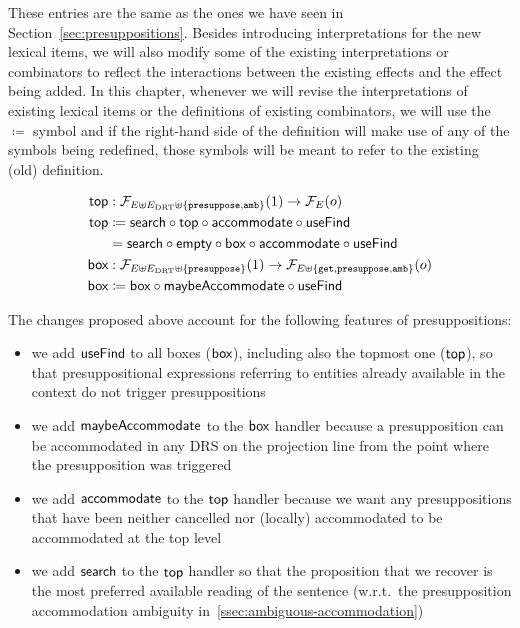 These entries are the same as the ones we have seen in
Section~\ref{sec:presuppositions}. Besides introducing interpretations for
the new lexical items, we will also modify some of the existing
interpretations or combinators to reflect the interactions between the
existing effects and the effect being added. In this chapter, whenever we
will revise the interpretations of existing lexical items or the
definitions of existing combinators, we will use the $\coloneqq$ symbol and
if the right-hand side of the definition will make use of any of the
symbols being redefined, those symbols will be meant to refer to the
existing (old) definition.

\begin{align*}
  \textsf{top} &: \mathcal{F}_{E \uplus E_{\mathrm{DRT}} \uplus \{\mathtt{presuppose}, \mathtt{amb}\}}(1) \to \mathcal{F}_{E}(o) \\
  \textsf{top} &\coloneqq \textsf{search} \mathbin{\circ} \textsf{top} \mathbin{\circ} \textsf{accommodate} \mathbin{\circ} \textsf{useFind} \\
       &= \textsf{search} \mathbin{\circ} \textsf{empty} \mathbin{\circ} \textsf{box} \mathbin{\circ} \textsf{accommodate} \mathbin{\circ} \textsf{useFind} \\
  \textsf{box} &: \mathcal{F}_{E \uplus E_{\mathrm{DRT}} \uplus \{\mathtt{presuppose}\}}(1) \to \mathcal{F}_{E \uplus \{\mathtt{get}, \mathtt{presuppose}, \mathtt{amb}\}}(o) \\
  \textsf{box} &\coloneqq \textsf{box} \mathbin{\circ} \textsf{maybeAccommodate} \mathbin{\circ} \textsf{useFind} \\
\end{align*}

The changes proposed above account for the following features of
presuppositions:

\begin{itemize}
\item we add $\textsf{useFind}$ to all boxes ($\textsf{box}$), including also the topmost
  one ($\textsf{top}$), so that presuppositional expressions referring to entities
  already available in the context do not trigger presuppositions
\item we add $\textsf{maybeAccommodate}$ to the $\textsf{box}$ handler because a
  presupposition can be accommodated in any DRS on the projection line from
  the point where the presupposition was triggered
\item we add $\textsf{accommodate}$ to the $\textsf{top}$ handler because we want any
  presuppositions that have been neither cancelled nor (locally)
  accommodated to be accommodated at the top level
\item we add $\textsf{search}$ to the $\textsf{top}$ handler so that the proposition that
  we recover is the most preferred available reading of the sentence
  (w.r.t.\ the presupposition accommodation ambiguity
  in~\ref{ssec:ambiguous-accommodation})
\end{itemize}

